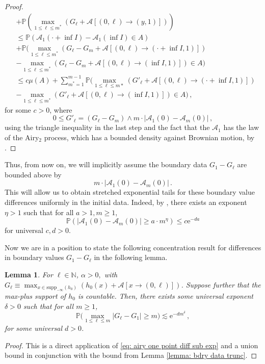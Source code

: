 \documentclass[11pt, reqno]{amsart}
\numberwithin{equation}{section}
\newcounter{dummy} \numberwithin{dummy}{section}
\newtheorem{lemma}[dummy]{Lemma}
\newcommand{\N}{\ensuremath{\mathbb{N}}}
\newcommand{\PP}{\ensuremath{\mathbb{P}}}
\begin{document}
\begin{proof}
\begin{align*}
        &+ \PP\left(\max_{1\le \ell\leq m^*}(G_{\ell}+\mathcal{A}[(0,\ell)\to (y,1)])\right)\\
        &\le \PP(\mathcal{A}_1(\cdot + \inf I)-\mathcal{A}_1(\inf I)\in A)\\
        &+ \PP\bigg(\max_{1\le \ell\leq m^*}(G_{\ell}-G_m+\mathcal{A}[(0,\ell)\to (\cdot + \inf I ,1)])\\
        &-\max_{1\le \ell\leq m^*}(G_{\ell}-G_m+\mathcal{A}[(0,\ell)\to (\inf I ,1)])\in A\bigg)\\
        &\le c\mu(A)+ \displaystyle\sum_{m^* = 1}^{m-1}\PP\bigg(\max_{1\le \ell\leq m*}(G'_{\ell}+\mathcal{A}[(0,\ell)\to (\cdot + \inf I ,1)])\\
        &-\max_{1\le \ell\leq m^*}(G'_{\ell}+\mathcal{A}[(0,\ell)\to (\inf I ,1)])\in A\bigg)\,,
    \end{align*}
    for some $c>0$, where 
    \begin{equation*}
    0\le G'_{\ell} = (G_\ell - G_m)\land m \cdot|\mathcal{A}_1(0) - \mathcal{A}_m (0)|\,,
    \end{equation*}
    using the triangle inequality in the last step and the fact that the $\mathcal{A}_1$ has the law of the Airy$_2$ process, which has a bounded density against Brownian motion, by \cite[Theorem~1.1]{dauvergne2024wienerdensitiesairyline}.
\end{proof}

Thus, from now on, we will implicitly assume the boundary data $G_1 - G_\ell$ are bounded above by 
\[
m \cdot |\mathcal{A}_1(0) - \mathcal{A}_m (0)|\,.
\]
This will allow us to obtain stretched exponential tails for these boundary value differences uniformly in the initial data. Indeed, by \cite[Corollary 5.3]{dauvergne2021}, there exists an exponent $\eta > 1$ such that for all $a > 1, m\ge 1$,
\begin{equation}\label{eq: airy one point diff sub exp}
    \PP(|\mathcal{A}_1(0) - \mathcal{A}_m (0)| \ge a\cdot m^\eta)\le c\mathrm{e}^{-da}
\end{equation}
for universal $c, d> 0$.

Now we are in a position to state the following concentration result for differences in boundary values $G_1-G_\ell$ in the following lemma. 

\begin{lemma}\label{lemma: boundary data control}
    For $\ell\in \N$, $\alpha > 0,$ with $G_\ell \equiv \displaystyle\max_{x\in \mathrm{supp}_{-\infty}(h_0)}(h_0(x)+\mathcal{A}[x\to (0,\ell)])$. Suppose further that the max-plus support of $h_0$ is countable. Then, there exists some universal exponent $\delta > 0$ such that for all $m\ge 1$,
    \begin{equation*}\mathbb{P}\bigg(\displaystyle\max_{1\le \ell\le m}|G_\ell-G_1|\ge m \bigg)\lesssim \mathrm{e}^{-dm^\delta}\,,
    \end{equation*}
    for some universal $d > 0$.
\end{lemma}
\begin{proof}
This is a direct application of \eqref{eq: airy one point diff sub exp} and a union bound in conjunction with the bound from Lemma \ref{lemma: bdry data trunc}.
\end{proof}
\end{document}
